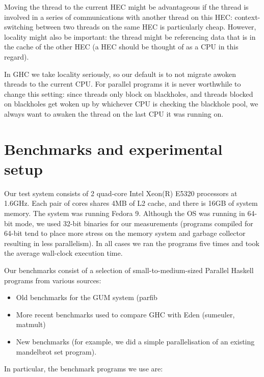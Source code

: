\documentclass[twocolumn,9pt]{sigplanconf}
\begin{document}
Moving the thread to the current HEC might be advantageous if the
thread is involved in a series of communications with another thread
on this HEC: context-switching between two threads on the same HEC is
particularly cheap.  However, locality might also be important: the
thread might be referencing data that is in the cache of the other HEC
(a HEC should be thought of as a CPU in this regard).

In GHC we take locality seriously, so our default is to not migrate
awoken threads to the current CPU.  For parallel programs it is never
worthwhile to change this setting: since threads only block on
blackholes, and threads blocked on blackholes get woken up by
whichever CPU is checking the blackhole pool, we always want to awaken
the thread on the last CPU it was running on.

\section{Benchmarks and experimental setup} \label{s:benchmarks}

Our test system consists of 2 quad-core Intel Xeon(R) E5320 processors
at 1.6GHz.  Each pair of cores shares 4MB of L2 cache, and there is
16GB of system memory.  The system was running Fedora 9.  Although the
OS was running in 64-bit mode, we used 32-bit binaries for our
measurements (programs compiled for 64-bit tend to place more stress
on the memory system and garbage collector resulting in less
parallelism).  In all cases we ran the programs five times and took
the average wall-clock execution time.

Our benchmarks consist of a selection of small-to-medium-sized
Parallel Haskell programs from various sources:

\begin{itemize}
\item Old benchmarks for the GUM system (parfib
\item More recent benchmarks used to compare GHC with Eden
  \cite{berthold:comparing} (sumeuler, matmult)
\item New benchmarks (for example, we did a simple parallelisation of
  an existing mandelbrot set program).
\end{itemize}

In particular, the benchmark programs we use are:
\end{document}
